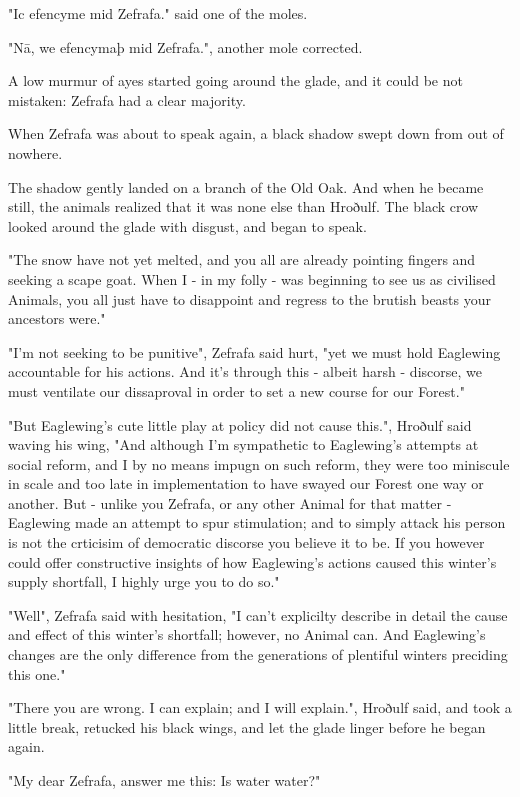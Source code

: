 "Ic efencyme mid Zefrafa." said one of the moles.

"Nā, we efencymaþ mid Zefrafa.", another mole corrected.

A low murmur of ayes started going around the glade, and it could be not mistaken: Zefrafa had a clear majority.

When Zefrafa was about to speak again, a black shadow swept down from out of nowhere. 

The shadow gently landed on a branch of the Old Oak. And when he became still, the animals realized that it was none else than Hroðulf. The black crow looked around the glade with disgust, and began to speak.

"The snow have not yet melted, and you all are already pointing fingers and seeking a scape goat. When I - in my folly - was beginning to see us as civilised Animals, you all just have to disappoint and regress to the brutish beasts your ancestors were."

"I'm not seeking to be punitive", Zefrafa said hurt, "yet we must hold Eaglewing accountable for his actions. And it's through this - albeit harsh - discorse, we must ventilate our dissaproval in order to set a new course for our Forest."

"But Eaglewing's cute little play at policy did not cause this.", Hroðulf said waving his wing, "And although I'm sympathetic to Eaglewing's attempts at social reform, and I by no means impugn on such reform, they were too miniscule in scale and too late in implementation to have swayed our Forest one way or another. But - unlike you Zefrafa, or any other Animal for that matter - Eaglewing made an attempt to spur stimulation; and to simply attack his person is not the crticisim of democratic discorse you believe it to be. If you however could offer constructive insights of how Eaglewing's actions caused this winter's supply shortfall, I highly urge you to do so."

"Well", Zefrafa said with hesitation, "I can't explicilty describe in detail the cause and effect of this winter's shortfall; however, no Animal can. And Eaglewing's changes are the only difference from the generations of plentiful winters preciding this one."

"There you are wrong. I can explain; and I will explain.", Hroðulf said, and took a little break, retucked his black wings, and let the glade linger before he began again.

"My dear Zefrafa, answer me this: Is water water?"

